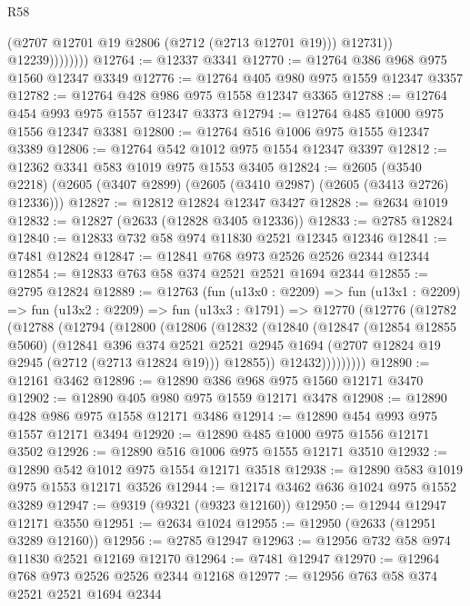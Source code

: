 \begin{lexlean}{R58}
\begin{coremodule}
                        (@2707 @12701 @19 @2806 (@2712 (@2713 @12701 @19)))
                        @12731))
                    @12239))))))))
@12764 := @12337 @3341
@12770 := @12764 @386 @968 @975 @1560 @12347 @3349
@12776 := @12764 @405 @980 @975 @1559 @12347 @3357
@12782 := @12764 @428 @986 @975 @1558 @12347 @3365
@12788 := @12764 @454 @993 @975 @1557 @12347 @3373
@12794 := @12764 @485 @1000 @975 @1556 @12347 @3381
@12800 := @12764 @516 @1006 @975 @1555 @12347 @3389
@12806 := @12764 @542 @1012 @975 @1554 @12347 @3397
@12812 := @12362 @3341 @583 @1019 @975 @1553 @3405
@12824 := @2605
    (@3540 @2218)
    (@2605 (@3407 @2899) (@2605 (@3410 @2987) (@2605 (@3413 @2726) @12336)))
@12827 := @12812 @12824 @12347 @3427
@12828 := @2634 @1019
@12832 := @12827 (@2633 (@12828 @3405 @12336))
@12833 := @2785 @12824
@12840 := @12833 @732 @58 @974 @11830 @2521 @12345 @12346
@12841 := @7481 @12824
@12847 := @12841 @768 @973 @2526 @2526 @2344 @12344
@12854 := @12833 @763 @58 @374 @2521 @2521 @1694 @2344
@12855 := @2795 @12824
@12889 := @12763
    (fun (u13x0 : @2209) =>
    fun (u13x1 : @2209) =>
    fun (u13x2 : @2209) =>
    fun (u13x3 : @1791) =>
    @12770
      (@12776
        (@12782
          (@12788
            (@12794
              (@12800
                (@12806
                  (@12832
                    (@12840
                      (@12847
                        (@12854 @12855 @5060)
                        (@12841
                          @396
                          @374
                          @2521
                          @2521
                          @2945
                          @1694
                          (@2707 @12824 @19 @2945 (@2712 (@2713 @12824 @19)))
                          @12855))
                      @12432)))))))))
@12890 := @12161 @3462
@12896 := @12890 @386 @968 @975 @1560 @12171 @3470
@12902 := @12890 @405 @980 @975 @1559 @12171 @3478
@12908 := @12890 @428 @986 @975 @1558 @12171 @3486
@12914 := @12890 @454 @993 @975 @1557 @12171 @3494
@12920 := @12890 @485 @1000 @975 @1556 @12171 @3502
@12926 := @12890 @516 @1006 @975 @1555 @12171 @3510
@12932 := @12890 @542 @1012 @975 @1554 @12171 @3518
@12938 := @12890 @583 @1019 @975 @1553 @12171 @3526
@12944 := @12174 @3462 @636 @1024 @975 @1552 @3289
@12947 := @9319 (@9321 (@9323 @12160))
@12950 := @12944 @12947 @12171 @3550
@12951 := @2634 @1024
@12955 := @12950 (@2633 (@12951 @3289 @12160))
@12956 := @2785 @12947
@12963 := @12956 @732 @58 @974 @11830 @2521 @12169 @12170
@12964 := @7481 @12947
@12970 := @12964 @768 @973 @2526 @2526 @2344 @12168
@12977 := @12956 @763 @58 @374 @2521 @2521 @1694 @2344

\end{coremodule}
\end{lexlean}

